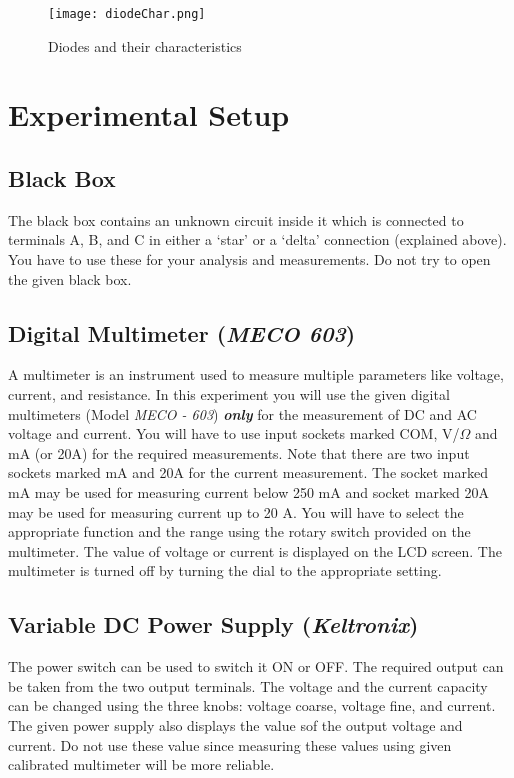 \begin{figure}[!htb]
\centering
\texttt{[image: diodeChar.png]}
\caption{Diodes and their characteristics}
\label{fig:diodeChar}
\end{figure}



\section*{Experimental Setup}


\subsection*{Black Box}
The black box contains an unknown circuit inside it which is connected to terminals A, B, and C in either a `star' or a `delta' connection (explained above). You have to use these for your analysis and measurements. Do not try to open the given black box.

\subsection*{Digital Multimeter (\textit{MECO 603})}

A multimeter is an instrument used to measure multiple parameters like voltage, current, and resistance. In this experiment you will use the given digital multimeters (Model \textit{MECO - 603}) \textbf{\textit{only}} for the measurement of DC and AC voltage and current. You will have to use input sockets marked COM, V/$\Omega$ and mA (or 20A) for the required measurements. Note that there are two input sockets marked mA and 20A for the current measurement. The socket marked mA may be used for measuring current below 250 mA and socket marked 20A may be used for measuring current up to 20 A. You will have to select the appropriate function and the range using the rotary switch provided on the multimeter. The value of voltage or current is displayed on the LCD screen. The multimeter is turned off by turning the dial to the appropriate setting.

\subsection*{Variable DC Power Supply (\textit{Keltronix})}

The power switch can be used to switch it ON or OFF. The required output can be taken from the two output terminals. The voltage and the current capacity can be changed using the three knobs: voltage coarse, voltage fine, and current. The given power supply also displays the value sof the output voltage and current. Do not use these value since measuring these values using given calibrated multimeter will be more reliable. 

